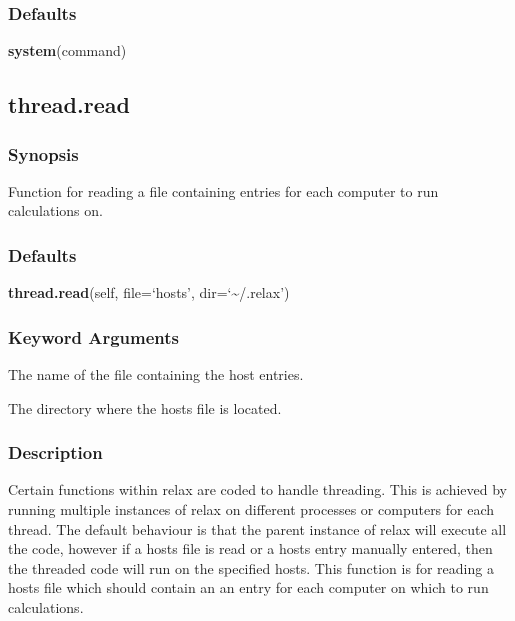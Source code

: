 \subsubsection{Defaults}

\textsf{\textbf{system}(command)}



\newpage

\subsection{thread.read}


\subsubsection{Synopsis}

Function for reading a file containing entries for each computer to run calculations on.



\subsubsection{Defaults}

\textsf{\textbf{thread.read}(self, file=`hosts', dir=`\~{}/.relax')}


\subsubsection{Keyword Arguments}

  The name of the file containing the host entries. 

  The directory where the hosts file is located. 




\subsubsection{Description}

Certain functions within relax are coded to handle threading.  This is achieved by running multiple instances of relax on different processes or computers for each thread.  The default behaviour is that the parent instance of relax will execute all the code, however if a hosts file is read or a hosts entry manually entered, then the threaded code will run on the specified hosts.  This function is for reading a hosts file which should contain an an entry for each computer on which to run calculations.



